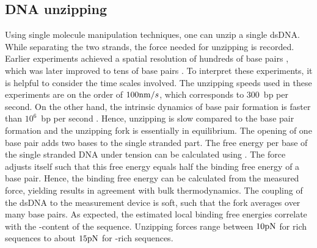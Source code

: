 \subsection{\label{sec:DNA_unzipping}DNA unzipping}
Using single molecule manipulation techniques, one can unzip a single dsDNA. While separating the
two strands, the force needed for unzipping is recorded. Earlier  experiments
achieved a spatial resolution of hundreds of base pairs \cite{Essevaz-Roulet_PNAS_97}, 
which was later improved to tens of base pairs \cite{Bockelmann_BiophysJ_02}. 
To interpret these experiments, it is helpful to consider the time scales involved.
The unzipping speeds used in these experiments are on the order of $100\mathrm{nm}/s$, which corresponds 
to 300~bp per second. On the other hand, the intrinsic dynamics of base pair formation is faster than
$10^{6}$~bp per second \cite{Craig_71, Anshelevich_Biopolymers_84}. Hence, unzipping is 
slow compared to the base pair formation and the unzipping fork is essentially in equilibrium.
The opening of one base pair adds two bases to the single stranded part. 
The free energy per base of the single stranded DNA under tension can be calculated using 
.  The force adjusts itself such that this free energy equals half the binding free energy of a base pair. Hence, the binding free energy can be calculated from the measured force, 
yielding results in agreement with bulk thermodynamics.
The coupling of the dsDNA to the measurement device is soft, such that the fork
averages over many base pairs.  As expected, the estimated local binding free energies correlate 
with the -content of the sequence. Unzipping forces range between $10\rm pN$ for  
rich sequences to about $15\rm pN$ for -rich sequences. 

